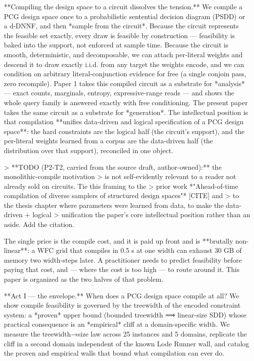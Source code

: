\documentclass[letterpaper]{article} %
\begin{document}
**Compiling the design space to a circuit dissolves the tension.** We compile a PCG design space
once to a probabilistic sentential decision diagram (PSDD) or a d-DNNF, and then *sample from the
circuit*. Because the circuit represents the feasible set exactly, every draw is feasible by
construction — feasibility is baked into the support, not enforced at sample time. Because the
circuit is smooth, deterministic, and decomposable, we can attach per-literal weights and descend it
to draw exactly i.i.d. from any target the weights encode, and we can condition on arbitrary
literal-conjunction evidence for free (a single conjoin pass, zero recompile). Paper 1 takes this
compiled circuit as a substrate for *analysis* — exact counts, marginals, entropy, expressive-range
reads — and shows the whole query family is answered exactly with free conditioning. The present
paper takes the same circuit as a substrate for *generation*. The intellectual position is that
compilation **unifies data-driven and logical specification of a PCG design space**: the hard
constraints are the logical half (the circuit's support), and the per-literal weights learned from a
corpus are the data-driven half (the distribution over that support), reconciled in one object.

> **TODO (P2-T2, carried from the source draft, author-owned):** the monolithic-compile motivation
> is not self-evidently relevant to a reader not already sold on circuits. Tie this framing to the
> prior work *"Ahead-of-time compilation of diverse samplers of structured design spaces"* [CITE] and
> to the thesis chapter where parameters were learned from data, to make the data-driven + logical
> unification the paper's core intellectual position rather than an aside. Add the citation.

The single price is the compile cost, and it is paid up front and is **brutally non-linear**: a WFC
grid that compiles in 0.5 s at one width can exhaust 30 GB of memory two width-steps later. A
practitioner needs to predict feasibility before paying that cost, and — where the cost is too high
— to route around it. This paper is organized as the two halves of that problem.


**Act I — the envelope.** When does a PCG design space compile at all? We show compile feasibility is
governed by the treewidth of the encoded constraint system: a *proven* upper bound (bounded
treewidth ⟹ linear-size SDD) whose practical consequence is an *empirical* cliff at a
domain-specific width. We measure the treewidth→size law across 25 instances and 5 domains, replicate
the cliff in a second domain independent of the known Lode Runner wall, and catalog the proven and
empirical walls that bound what compilation can ever do.
\end{document}
